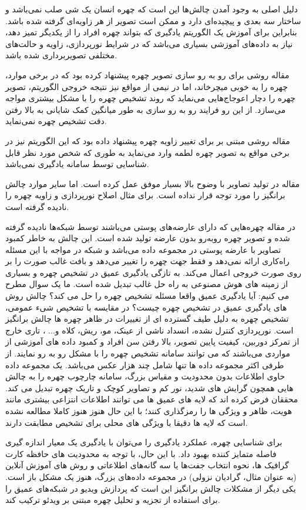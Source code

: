 \noindent
دلیل اصلی به وجود آمدن چالش‌ها این است که چهره انسان یک شی صلب نمی‌باشد و ساختار سه بعدی و پیچیده‌ای دارد و ممکن است تصویر از هر زاویه‌ای گرفته شده باشد. بنابراین برای آموزش یک الگوریتم یادگیری که بتواند چهره افراد را از یکدیگر تمیز دهد، نیاز به داده‌های آموزشی بسیاری می‌باشد که در شرایط نورپردازی، زاویه و حالت‌های مختلفی تصویربرداری شده باشد.

\noindent
مقاله \cite{HAGHIGHAT201623} روشی برای رو به رو سازی تصویر چهره پیشنهاد کرده بود که در برخی موارد، چهره را به خوبی میچرخاند، اما در نیمی از مواقع نیز نتیجه خروجی الگوریتم، تصویر چهره را دچار اعوجاج‌هایی می‌نماید که روند تشخیص چهره را با مشکل بیشتری مواجه می‌سازد. از این رو فرایند رو به رو سازی به طور میانگین کمک شایانی به بالا رفتن دقت تشخیص چهره نمی‌نماید.

\noindent
مقاله \cite{radford2016unsupervised} روشی مبتنی بر  برای تغییر زاویه چهره پیشنهاد داده بود که این الگوریتم نیز در برخی مواقع به تصویر چهره لطمه وارد می‌نماید به طوری که شخص مورد نظر قابل شناسایی توسط سامانه یادگیری نمی‌باشد.

\noindent
مقاله  \cite{BANERJEE2018246} در تولید تصاویر با وضوح بالا بسیار موفق عمل کرده است. اما سایر موارد چالش برانگیز را مورد توجه قرار نداده است. برای مثال اصلاح نورپردازی و زاویه چهره را نادیده گرفته است.

\noindent
در مقاله \cite{8603840} چهره‌هایی که دارای عارضه‌های پوستی می‌باشند توسط شبکه‌ها نادیده گرفته شده و تصویر چهره روبه‌رو بدون عارضه تولید شده است. این چالش به خاطر کمبود تصاویر با عارضه پوستی در مجموعه داده می‌باشد و شبکه در مواجه با این مسئله راه‌کاری ارائه نمی‌دهد و فقط جهت چهره را تغییر می‌دهد و بافت غالب صورت را بر روی صورت خروجی اعمال می‌کند.
\noindent
به تازگی یادگیری عمیق در تشخیص چهره و بسیاری از زمینه های هوش مصنوعی به راه حل غالب تبدیل شده است. ما یک سوال مطرح می کنیم: آیا یادگیری عمیق واقعا مسئله تشخیص چهره را حل می کند؟ چالش روش های یادگیری عمیق در تشخیص چهره چیست؟ 
\noindent
در مقایسه با تشخیص شیء عمومی، تشخیص چهره به دلیل طیف گسترده ای از تغییرات در ظاهر چهره ها چالش برانگیز است. نورپردازی کنترل نشده، انسداد ناشی از عینک، مو، ریش، کلاه و... ، تاری خارج از تمرکز دوربین، کیفیت پایین تصویر، بالا رفتن سن افراد و کمبود داده های آموزشی از مواردی می‌باشند که می توانند سامانه تشخیص چهره را با مشکل رو به رو نمایند. از طرفی اکثر مجموعه داده ها تنها شامل چند هزار عکس می‌باشد. یک مجموعه داده حاوی اطلاعات بدون محدودیت و مقیاس بزرگ، سامانه چارچوب چهره را به چالش هایی همچون گرایش های شدید، نور کم و تصاویر کوچک و تاریک چهره تبدیل می کند. محققان فرض کرده اند که لایه های عمیق  ها می توانند اطلاعات انتزاعی بیشتری مانند هویت، ظاهر و ویژگی ها را رمزگذاری کنند؛ با این حال هنوز هنوز کاملا مطالعه نشده است که لایه ها دقیقا با ویژگی های محلی برای تشخیص مطابقت دارند.

\noindent
برای شناسایی چهره، عملکرد یادگیری را می‌توان با یادگیری یک معیار اندازه گیری فاصله متمایز کننده بهبود داد. با این حال، با توجه به محدودیت های حافظه کارت گرافیک ها، نحوه انتخاب جفت‌ها یا سه گانه‌های اطلاعاتی و روش های آموزش آنلاین (به عنوان مثال، گرادیان نزولی) در مجموعه داده‌های بزرگ، هنوز یک مشکل باز است. یکی دیگر از مشکلات چالش برانگیز این است که پردازش ویدیو در شبکه‌های عمیق را برای استفاده از تجزیه و تحلیل چهره مبتنی بر ویدئو ترکیب کند.
